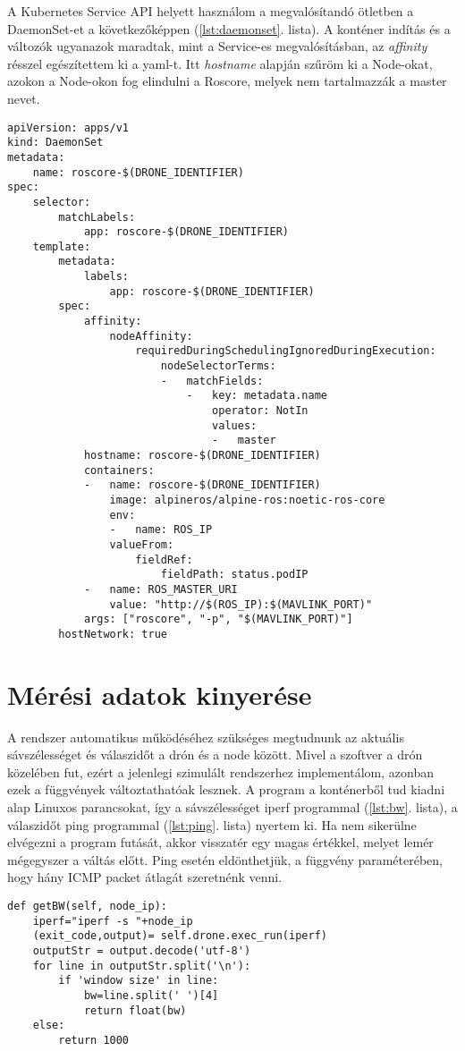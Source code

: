 \noindent
A Kubernetes Service API helyett használom a megvalósítandó ötletben a DaemonSet-et a következőképpen (\ref{lst:daemonset}. lista). A konténer indítás és a változók ugyanazok maradtak, mint a Service-es megvalósításban, az \emph{affinity} résszel egészítettem ki a yaml-t. Itt \emph{hostname} alapján szűröm ki a Node-okat, azokon a Node-okon fog elindulni a Roscore, melyek nem tartalmazzák a master nevet.

\begin{lstlisting}[caption={DaemonSet megvalósítás, Roscore minden worker-en}, label={lst:daemonset}]
apiVersion: apps/v1
kind: DaemonSet
metadata:
	name: roscore-$(DRONE_IDENTIFIER)
spec:
	selector:
		matchLabels:
			app: roscore-$(DRONE_IDENTIFIER)
	template:
		metadata:
			labels:
				app: roscore-$(DRONE_IDENTIFIER)
		spec:
			affinity:
				nodeAffinity:
					requiredDuringSchedulingIgnoredDuringExecution:
						nodeSelectorTerms:
						-	matchFields:
							-	key: metadata.name
								operator: NotIn
								values:
								-	master
			hostname: roscore-$(DRONE_IDENTIFIER)
			containers:
			-	name: roscore-$(DRONE_IDENTIFIER)
				image: alpineros/alpine-ros:noetic-ros-core 
				env:
				-	name: ROS_IP
				valueFrom:
					fieldRef:
						fieldPath: status.podIP
			-	name: ROS_MASTER_URI
				value: "http://$(ROS_IP):$(MAVLINK_PORT)"
			args: ["roscore", "-p", "$(MAVLINK_PORT)"]
		hostNetwork: true
\end{lstlisting}

\section{Mérési adatok kinyerése}
A rendszer automatikus működéséhez szükséges megtudnunk az aktuális sávszélességet és válaszidőt a drón és a node között. Mivel a szoftver a drón közelében fut, ezért a jelenlegi szimulált rendszerhez implementálom, azonban ezek a függvények változtathatóak lesznek. A program a konténerből tud kiadni alap Linuxos parancsokat, így a sávszélességet iperf programmal (\ref{lst:bw}. lista), a válaszidőt ping programmal (\ref{lst:ping}. lista)  nyertem ki. Ha nem sikerülne elvégezni a program futását, akkor visszatér egy magas értékkel, melyet lemér mégegyszer a váltás előtt. Ping esetén eldönthetjük, a függvény paraméterében, hogy hány ICMP packet átlagát szeretnénk venni.

\begin{lstlisting}[caption={Sávszélesség megállapítása a konténer és a node között}, label={lst:bw}]
def getBW(self, node_ip):
	iperf="iperf -s "+node_ip
	(exit_code,output)= self.drone.exec_run(iperf)
	outputStr = output.decode('utf-8')
	for line in outputStr.split('\n'):
		if 'window size' in line:
			bw=line.split(' ')[4]
			return float(bw)
	else:
		return 1000
\end{lstlisting}

